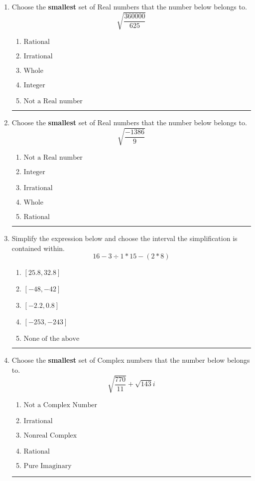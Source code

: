 \documentclass[14pt]{extbook}
\newcommand{\litem}[1]{\item#1\hspace*{-1cm}\rule{\textwidth}{0.4pt}}
\begin{document}
\begin{enumerate}
{\begin{enumerate}[label=\Alph*.]
\end{enumerate} }
\litem{
Choose the \textbf{smallest} set of Real numbers that the number below belongs to.\[ \sqrt{\frac{360000}{625}} \]\begin{enumerate}[label=\Alph*.]
\item \( \text{Rational} \)
\item \( \text{Irrational} \)
\item \( \text{Whole} \)
\item \( \text{Integer} \)
\item \( \text{Not a Real number} \)

\end{enumerate} }
\litem{
Choose the \textbf{smallest} set of Real numbers that the number below belongs to.\[ \sqrt{\frac{-1386}{9}} \]\begin{enumerate}[label=\Alph*.]
\item \( \text{Not a Real number} \)
\item \( \text{Integer} \)
\item \( \text{Irrational} \)
\item \( \text{Whole} \)
\item \( \text{Rational} \)

\end{enumerate} }
\litem{
Simplify the expression below and choose the interval the simplification is contained within.\[ 16 - 3 \div 1 * 15 - (2 * 8) \]\begin{enumerate}[label=\Alph*.]
\item \( [25.8, 32.8] \)
\item \( [-48, -42] \)
\item \( [-2.2, 0.8] \)
\item \( [-253, -243] \)
\item \( \text{None of the above} \)

\end{enumerate} }
\litem{
Choose the \textbf{smallest} set of Complex numbers that the number below belongs to.\[ \sqrt{\frac{770}{11}}+\sqrt{143} i \]\begin{enumerate}[label=\Alph*.]
\item \( \text{Not a Complex Number} \)
\item \( \text{Irrational} \)
\item \( \text{Nonreal Complex} \)
\item \( \text{Rational} \)
\item \( \text{Pure Imaginary} \)


\end{enumerate}}
\end{enumerate}
\end{document}
